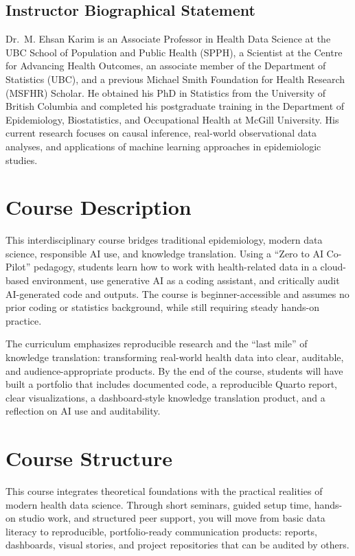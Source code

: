 \documentclass[
  letterpaper,
  DIV=11,
  numbers=noendperiod,
  oneside]{scrreprt}
\begin{document}
\subsection{Instructor Biographical
Statement}\label{instructor-biographical-statement}

Dr.~M. Ehsan Karim is an Associate Professor in Health Data Science at
the UBC School of Population and Public Health (SPPH), a Scientist at
the Centre for Advancing Health Outcomes, an associate member of the
Department of Statistics (UBC), and a previous Michael Smith Foundation
for Health Research (MSFHR) Scholar. He obtained his PhD in Statistics
from the University of British Columbia and completed his postgraduate
training in the Department of Epidemiology, Biostatistics, and
Occupational Health at McGill University. His current research focuses
on causal inference, real-world observational data analyses, and
applications of machine learning approaches in epidemiologic studies.

\section{Course Description}\label{course-description}

This interdisciplinary course bridges traditional epidemiology, modern
data science, responsible AI use, and knowledge translation. Using a
``Zero to AI Co-Pilot'' pedagogy, students learn how to work with
health-related data in a cloud-based environment, use generative AI as a
coding assistant, and critically audit AI-generated code and outputs.
The course is beginner-accessible and assumes no prior coding or
statistics background, while still requiring steady hands-on practice.

The curriculum emphasizes reproducible research and the ``last mile'' of
knowledge translation: transforming real-world health data into clear,
auditable, and audience-appropriate products. By the end of the course,
students will have built a portfolio that includes documented code, a
reproducible Quarto report, clear visualizations, a dashboard-style
knowledge translation product, and a reflection on AI use and
auditability.

\section{Course Structure}\label{course-structure}

This course integrates theoretical foundations with the practical
realities of modern health data science. Through short seminars, guided
setup time, hands-on studio work, and structured peer support, you will
move from basic data literacy to reproducible, portfolio-ready
communication products: reports, dashboards, visual stories, and project
repositories that can be audited by others.
\end{document}
